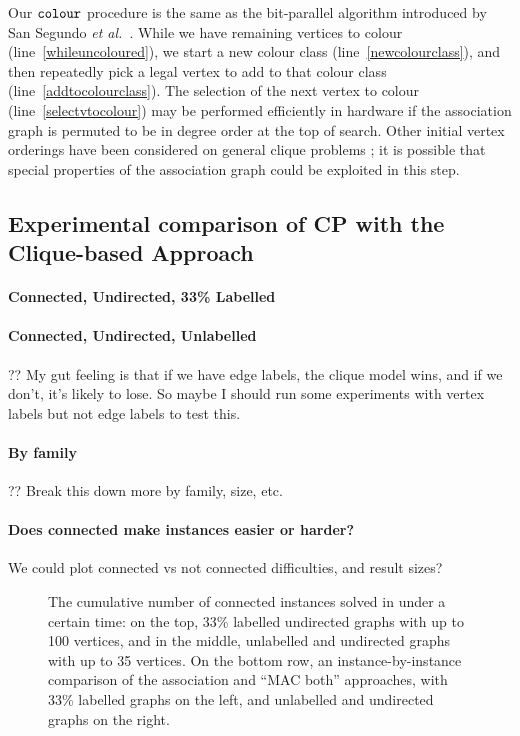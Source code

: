 \documentclass{llncs}
\newcommand{\lineref}[1]{line~\ref{#1}}
\begin{document}
Our $\FuncSty{colour}$ procedure is the same as the bit-parallel algorithm introduced by San Segundo
\textit{et al.}\ \cite{DBLP:journals/cor/SegundoRJ11}. While we have remaining vertices to colour
(\lineref{whileuncoloured}), we start a new colour class (\lineref{newcolourclass}), and then
repeatedly pick a legal vertex to add to that colour class (\lineref{addtocolourclass}).  The
selection of the next vertex to colour (\lineref{selectvtocolour}) may be performed efficiently in
hardware if the association graph is permuted to be in degree order at the top of search. Other
initial vertex orderings have been considered on general clique problems
\cite{DBLP:journals/algorithms/Prosser12,DBLP:conf/lion/SegundoLB14}; it is possible that special
properties of the association graph could be exploited in this step.


\subsection{Experimental comparison of CP with the Clique-based Approach}\label{mccs-eval}


\paragraph{Connected, Undirected, 33\% Labelled}

\paragraph{Connected, Undirected, Unlabelled}

?? My gut feeling is that if we have edge labels, the clique model wins, and if we don't, it's
likely to lose. So maybe I should run some experiments with vertex labels but not edge labels to
test this.

\paragraph{By family} ?? Break this down more by family, size, etc.

\paragraph{Does connected make instances easier or harder?} We could plot connected vs not connected
difficulties, and result sizes?

\begin{figure}[p]
    \centering
    
    \vspace*{1em}

    \centering
    
    \caption{The cumulative number of connected instances solved in under a certain time: on the
        top, 33\% labelled undirected graphs with up to 100 vertices, and in the middle, unlabelled
        and undirected graphs with up to 35 vertices. On the bottom row, an instance-by-instance
        comparison of the association and ``MAC both'' approaches, with 33\% labelled graphs on the
        left, and unlabelled and undirected graphs on the right.} \label{figure:connected-cumulative}
\end{figure}
\end{document}
